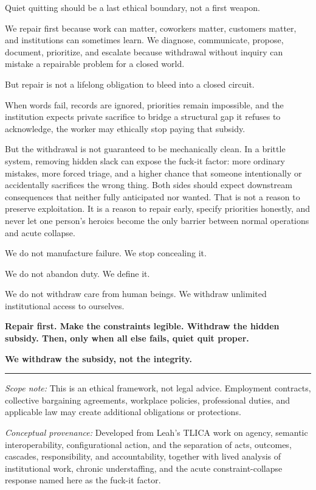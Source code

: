\documentclass[11pt,oneside]{article}
\begin{document}
Quiet quitting should be a last ethical boundary, not a first weapon.

We repair first because work can matter, coworkers matter, customers
matter, and institutions can sometimes learn. We diagnose, communicate,
propose, document, prioritize, and escalate because withdrawal without
inquiry can mistake a repairable problem for a closed world.

But repair is not a lifelong obligation to bleed into a closed circuit.

When words fail, records are ignored, priorities remain impossible, and
the institution expects private sacrifice to bridge a structural gap it
refuses to acknowledge, the worker may ethically stop paying that
subsidy.

But the withdrawal is not guaranteed to be mechanically clean. In a
brittle system, removing hidden slack can expose the fuck-it factor:
more ordinary mistakes, more forced triage, and a higher chance that
someone intentionally or accidentally sacrifices the wrong thing. Both
sides should expect downstream consequences that neither fully
anticipated nor wanted. That is not a reason to preserve exploitation.
It is a reason to repair early, specify priorities honestly, and never
let one person's heroics become the only barrier between normal
operations and acute collapse.

We do not manufacture failure. We stop concealing it.

We do not abandon duty. We define it.

We do not withdraw care from human beings. We withdraw unlimited
institutional access to ourselves.

\textbf{Repair first. Make the constraints legible. Withdraw the hidden
subsidy. Then, only when all else fails, quiet quit proper.}

\textbf{We withdraw the subsidy, not the integrity.}

\begin{center}\rule{0.5\linewidth}{0.5pt}\end{center}

\emph{Scope note:} This is an ethical framework, not legal advice.
Employment contracts, collective bargaining agreements, workplace
policies, professional duties, and applicable law may create additional
obligations or protections.

\emph{Conceptual provenance:} Developed from Leah's TLICA work on
agency, semantic interoperability, configurational action, and the
separation of acts, outcomes, cascades, responsibility, and
accountability, together with lived analysis of institutional work,
chronic understaffing, and the acute constraint-collapse response named
here as the fuck-it factor.
\end{document}

